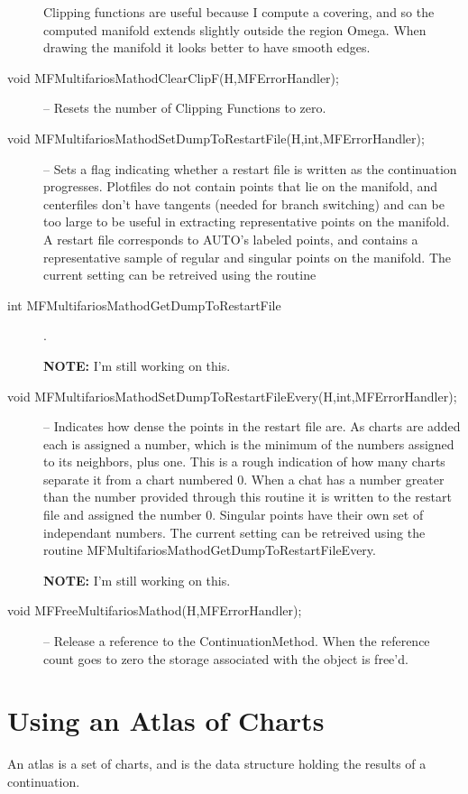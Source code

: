 \documentclass[12pt]{article}
\begin{document}
\begin{description}
Clipping functions are useful because I compute a covering, and so the computed manifold extends 
slightly outside the region Omega. When drawing the manifold it looks better to have smooth edges.
\item [void MFMultifariosMathodClearClipF(H,MFErrorHandler);]
-- Resets the number of Clipping Functions to zero.
\item [void MFMultifariosMathodSetDumpToRestartFile(H,int,MFErrorHandler);]
-- Sets a flag indicating whether a restart file is written as the continuation progresses.
Plotfiles do not contain points that lie on the manifold, and centerfiles don't have tangents
(needed for branch switching) and can be too large to be useful in extracting representative
points on the manifold. A restart file corresponds to AUTO's labeled points, and contains a
representative sample of regular and singular points on the manifold.
The current setting can be retreived using the routine
\item [int MFMultifariosMathodGetDumpToRestartFile].

{\bf NOTE: } I'm still working on this.
\item [void MFMultifariosMathodSetDumpToRestartFileEvery(H,int,MFErrorHandler);]
-- Indicates how dense the points in the restart file are. As charts are added each is
assigned a number, which is the minimum of the numbers assigned to its neighbors, plus one. This
is a rough indication of how many charts separate it from a chart numbered 0. When a chat has a number
greater than the number provided through this routine it is written to the restart file and assigned
the number 0. Singular points have their own set of independant numbers.
The current setting can be retreived using the routine {MFMultifariosMathodGetDumpToRestartFileEvery}.

{\bf NOTE: } I'm still working on this.
\item [void MFFreeMultifariosMathod(H,MFErrorHandler);]
-- Release a reference to the ContinuationMethod. When the reference count goes to zero the
   storage associated with the object is free'd.
\end{description}

\section{Using an Atlas of Charts}
    An atlas is a set of charts, and is the data structure holding the results of a continuation.
\end{document}
